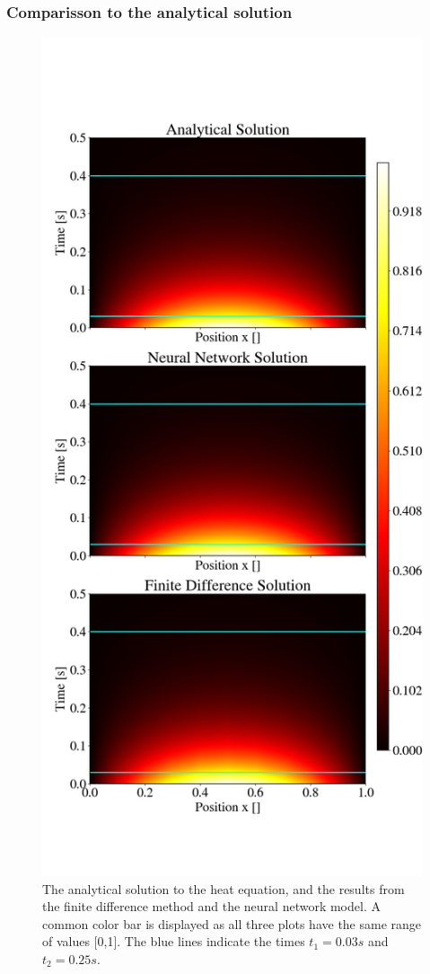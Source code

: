 \subsubsection{Comparisson to the analytical solution}
\begin{figure}[h!]
    \centering
    \includegraphics[width=1.0\linewidth]{project_3/plots/heat_map_comparison.png}
    \caption{The analytical solution to the heat equation, and the results from the finite difference method and the neural network model. A common color bar is displayed as all three plots have the same range of values [0,1]. The blue lines indicate the times $t_1 = 0.03 s$ and $t_2 = 0.25 s$.}
    \label{fig:heatmaps}
\end{figure}


